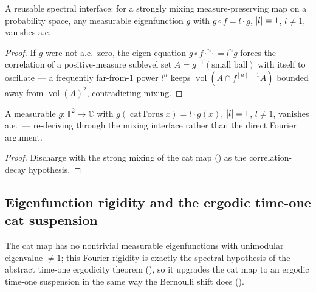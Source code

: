 \begin{lemma}\label{eigenfunction_ae_zero_of_mixing}
  \leanok
  A reusable spectral interface: for a strongly mixing measure-preserving map on a probability
  space, any measurable eigenfunction \(g\) with \(g\circ f = l\cdot g\), \(\left\lvert l \right\rvert = 1\),
  \(l\ne 1\), vanishes a.e.
\end{lemma}
\begin{proof}\leanok
  If \(g\) were not a.e.\ zero, the eigen-equation \(g\circ f^{[n]} = l^{n} g\) forces the correlation
  of a positive-measure sublevel set \(A = g^{-1}(\text{small ball})\) with itself to oscillate --- a
  frequently far-from-\(1\) power \(l^{n}\) keeps \(\operatorname{vol}(A\cap f^{[n]\,-1}A)\) bounded
  away from \(\operatorname{vol}(A)^2\), contradicting mixing.
\end{proof}

\begin{corollary}\label{catTorus_eigenfunction_ae_zero_of_mixing}
  \leanok
  A measurable \(g:\mathbb{T}^2\to\mathbb C\) with \(g(\operatorname{catTorus} x) = l\cdot g(x)\),
  \(\left\lvert l \right\rvert = 1\), \(l\ne 1\), vanishes a.e.\ --- re-deriving  through the
  mixing interface rather than the direct Fourier argument.
\end{corollary}
\begin{proof}\leanok
  Discharge  with the strong mixing of the cat map
  () as the correlation-decay hypothesis.
\end{proof}

\subsection{Eigenfunction rigidity and the ergodic time-one cat suspension}

The cat map has no nontrivial measurable eigenfunctions with unimodular eigenvalue \(\ne 1\); this
Fourier rigidity is exactly the spectral hypothesis of the abstract time-one ergodicity theorem
(), so it upgrades the cat map to an ergodic time-one suspension in
the same way the Bernoulli shift does ().

